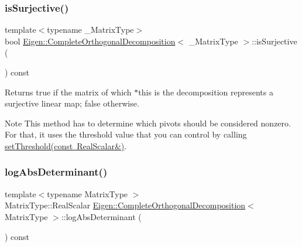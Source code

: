 \subsubsection{\texorpdfstring{isSurjective()}{isSurjective()}}
{\footnotesize\ttfamily template$<$typename \+\_\+\+Matrix\+Type$>$ \\
bool \mbox{\hyperlink{class_eigen_1_1_complete_orthogonal_decomposition}{Eigen\+::\+Complete\+Orthogonal\+Decomposition}}$<$ \+\_\+\+Matrix\+Type $>$\+::is\+Surjective (\begin{DoxyParamCaption}{ }\end{DoxyParamCaption}) const\hspace{0.3cm}{\ttfamily [inline]}}

\begin{DoxyReturn}{Returns}
true if the matrix of which $\ast$this is the decomposition represents a surjective linear map; false otherwise.
\end{DoxyReturn}
\begin{DoxyNote}{Note}
This method has to determine which pivots should be considered nonzero. For that, it uses the threshold value that you can control by calling \mbox{\hyperlink{class_eigen_1_1_complete_orthogonal_decomposition_aa9c9f7cbde9d58ca5552381b70ad8d82}{set\+Threshold(const Real\+Scalar\&)}}. 
\end{DoxyNote}
\mbox{\label{class_eigen_1_1_complete_orthogonal_decomposition_ad59d6dc78dab52a0038ac372b4a72c0d}} 
\subsubsection{\texorpdfstring{logAbsDeterminant()}{logAbsDeterminant()}}
{\footnotesize\ttfamily template$<$typename Matrix\+Type $>$ \\
Matrix\+Type\+::\+Real\+Scalar \mbox{\hyperlink{class_eigen_1_1_complete_orthogonal_decomposition}{Eigen\+::\+Complete\+Orthogonal\+Decomposition}}$<$ Matrix\+Type $>$\+::log\+Abs\+Determinant (\begin{DoxyParamCaption}{ }\end{DoxyParamCaption}) const}

